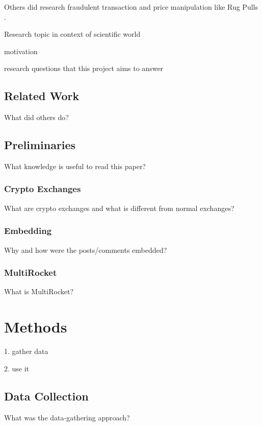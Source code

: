 \documentclass[pdflatex,sn-apa]{sn-jnl}
\begin{document}
Others did research fraudulent transaction and price manipulation like Rug Pulls \citep{mazorra_do_not_rug_on_me_2022}.

Research topic in context of scientific world

motivation

research questions that this project aims to answer

\subsection{Related Work}\label{related_work}
What did others do?

\subsection{Preliminaries}\label{preliminaries}

What knowledge is useful to read this paper?

\subsubsection{Crypto Exchanges}\label{crypto_stocks}

What are crypto exchanges and what is different from normal exchanges?

\subsubsection{Embedding}\label{embedding}

Why and how were the posts/comments embedded?

\subsubsection{MultiRocket}\label{multirocket}

What is MultiRocket?

\section{Methods}\label{methods}

1. gather data

2. use it

\subsection{Data Collection}\label{data_collection}

What was the data-gathering approach?
\end{document}

